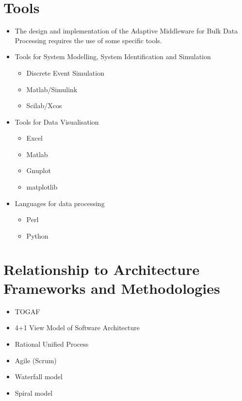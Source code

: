 \section{Tools} %
\label{sec:ch6_tools}

\begin{itemize}
	\item The design and implementation of the Adaptive Middleware for Bulk Data Processing requires the use of some specific tools.
\end{itemize}

\begin{itemize}
	\item Tools for System Modelling, System Identification and Simulation
	\begin{itemize}
		\item Discrete Event Simulation
		\item Matlab/Simulink
		\item Scilab/Xcos
	\end{itemize}
	\item Tools for Data Visualisation
	\begin{itemize}
		\item Excel
		\item Matlab
		\item Gnuplot
		\item matplotlib
	\end{itemize}
	\item Languages for data processing
	\begin{itemize}
		\item Perl
		\item Python
	\end{itemize}
\end{itemize}


\section{Relationship to Architecture Frameworks and Methodologies} %
\label{sec:ch6_relation_frameworks}
\begin{itemize}
	\item TOGAF
	\item 4+1 View Model of Software Architecture
	\item Rational Unified Process
	\item Agile (Scrum)
	\item Waterfall model
	\item Spiral model
\end{itemize}

